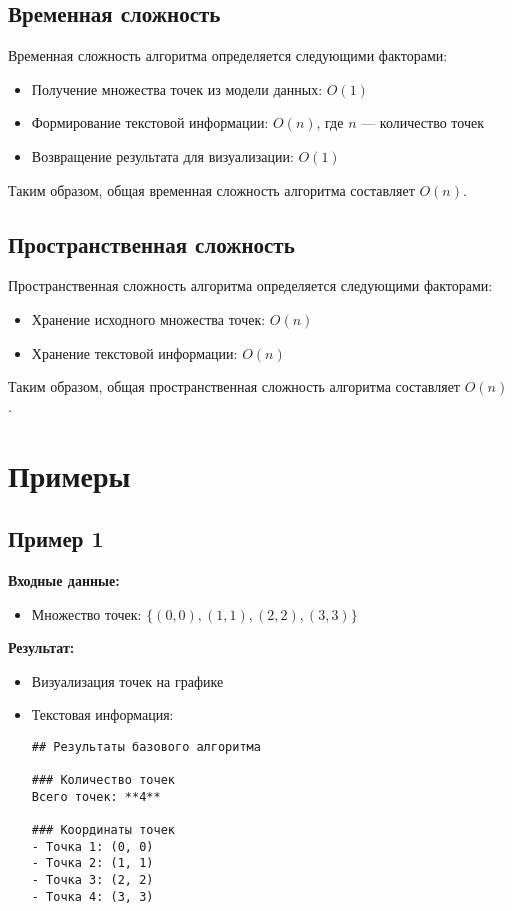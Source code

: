 \documentclass[a4paper,12pt]{article}
\begin{document}
\subsection{Временная сложность}

Временная сложность алгоритма определяется следующими факторами:
\begin{itemize}
    \item Получение множества точек из модели данных: $O(1)$
    \item Формирование текстовой информации: $O(n)$, где $n$ — количество точек
    \item Возвращение результата для визуализации: $O(1)$
\end{itemize}

Таким образом, общая временная сложность алгоритма составляет $O(n)$.

\subsection{Пространственная сложность}

Пространственная сложность алгоритма определяется следующими факторами:
\begin{itemize}
    \item Хранение исходного множества точек: $O(n)$
    \item Хранение текстовой информации: $O(n)$
\end{itemize}

Таким образом, общая пространственная сложность алгоритма составляет $O(n)$.

\section{Примеры}

\subsection{Пример 1}

\textbf{Входные данные:}
\begin{itemize}
    \item Множество точек: $\{(0, 0), (1, 1), (2, 2), (3, 3)\}$
\end{itemize}

\textbf{Результат:}
\begin{itemize}
    \item Визуализация точек на графике
    \item Текстовая информация:
    \begin{verbatim}
## Результаты базового алгоритма

### Количество точек
Всего точек: **4**

### Координаты точек
- Точка 1: (0, 0)
- Точка 2: (1, 1)
- Точка 3: (2, 2)
- Точка 4: (3, 3)
    \end{verbatim}
\end{itemize}
\end{document}
